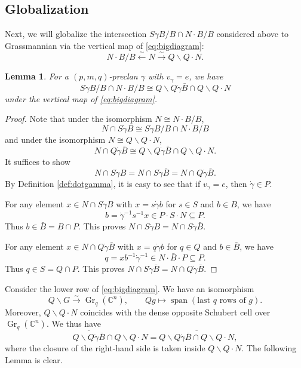 \documentclass[12pt,reqno]{amsart}
\numberwithin{equation}{section}
\newtheorem{lemma}[theorem]{Lemma}
\theoremstyle{definition}
\begin{document}
\subsection{Globalization}
Next, we will globalize the intersection $S\dot{\gamma}B/B\cap N\cdot B/B$ considered above to Grassmannian via the vertical map of \eqref{eq:bigdiagram}: 
$$
N\cdot B/B
\stackrel{\sim}\longleftarrow N\stackrel{\sim}\longrightarrow Q\backslash Q\cdot N.$$

\begin{lemma}\label{lemma:diag3}
For a $(p,m,q)$-preclan $\gamma$ with $v_\gamma=e$, we have 
$$
S\dot{\gamma}B/B\cap N\cdot B/B
\cong Q\backslash Q\dot{\gamma}\bar{B}\cap Q\backslash Q\cdot N
$$
under the vertical map of \eqref{eq:bigdiagram}. 
\end{lemma}
\begin{proof}
Note that under the isomorphism
$N\cong N\cdot B/B$, 
$$N\cap S\dot{\gamma}B\cong 
S\dot{\gamma}B/B\cap N\cdot B/B$$
and under the isomorphism $N\cong Q\backslash Q\cdot N$, 
$$N\cap Q\dot{\gamma}\bar{B}\cong 
Q\backslash Q\dot{\gamma}\bar{B}\cap Q\backslash Q\cdot N.$$
It suffices to show 
$$
N\cap S\dot{\gamma}B = N\cap S\dot{\gamma}\bar{B} = N\cap Q\dot{\gamma}\bar{B}. $$
By Definition \ref{def:dotgamma}, it is easy to see that if $v_\gamma=e$, then $\dot{\gamma}\in P$. 

For any element $x\in N\cap S\dot{\gamma}B$ with $x=s\dot{\gamma}b$ for $s\in S$ and $b\in B$, we have 
$$b=\dot{\gamma}^{-1}s^{-1}x\in 
P\cdot S\cdot N\subseteq P. $$
Thus $b\in \bar{B}=B\cap P$. 
This proves 
$N\cap S\dot{\gamma}B = N\cap S\dot{\gamma}\bar{B}$. 

For any element $x\in N\cap Q\dot{\gamma}\bar{B}$ with $x=q\dot{\gamma}b$ for $q\in Q$ and $b\in\bar{B}$, we have 
$$q=xb^{-1}\dot{\gamma}^{-1}\in N\cdot \bar{B}\cdot P\subseteq P. $$
Thus $q\in S=Q\cap P$. 
This proves $N\cap S\dot{\gamma}\bar{B} = N\cap Q\dot{\gamma}\bar{B}$. 
\end{proof}

Consider the lower row of \eqref{eq:bigdiagram}. 
We have an isomorphism 
$$Q\backslash G
\stackrel{\sim}\longrightarrow
\operatorname{Gr}_q(\mathbb{C}^n),\qquad Qg\longmapsto \operatorname{span}(\text{last $q$ rows of $g$}).$$
Moreover, $Q\backslash Q\cdot N$ coincides with the dense opposite Schubert cell over $\operatorname{Gr}_q(\mathbb{C}^n)$. 
We thus have 
$$\overline{Q\backslash Q\dot{\gamma}\bar{B}}\cap Q\backslash Q\cdot N
= \overline{Q\backslash Q\dot{\gamma}\bar{B}\cap Q\backslash Q\cdot N},$$
where the closure of the right-hand side is taken inside $Q\backslash Q\cdot N$. 
The following Lemma is clear. 
\end{document}
